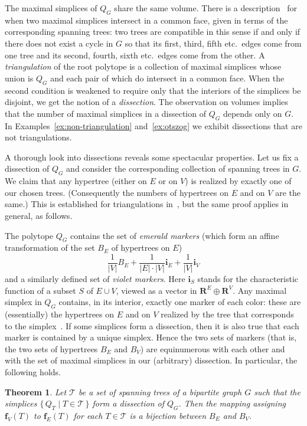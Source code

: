 \documentclass[10pt]{amsart}
\newtheorem{theo}{Theorem}[section]
\theoremstyle{definition}\newtheorem{defi}[theo]{Definition}
\theoremstyle{remark}\newtheorem{rema}[theo]{Remark}
\newcommand{\R}{\mathbf{R}}
\begin{document}
The maximal simplices of $Q_G$ share the same volume. There is a description~\cite[Lemma~12.6]{alex} for when two maximal simplices intersect in a common face, given in terms of the corresponding spanning trees: two trees are compatible in this sense if and only if there does not exist a cycle in $G$ so that its first, third, fifth etc.\ edges come from one tree and its second, fourth, sixth etc.\ edges come from the other. A \emph{triangulation} of the root polytope is a collection of maximal simplices whose union is $Q_G$ and each pair of which do intersect in a common face. When the second condition is weakened to require only that the interiors of the simplices be disjoint, we get the notion of a \emph{dissection}. The observation on volumes implies that the number of maximal simplices in a dissection of $Q_G$ depends only on $G$. In Examples~\ref{ex:non-triangulation} and~\ref{ex:otszog} we exhibit dissections that are not triangulations.

A thorough look into dissections reveals some spectacular properties. Let us fix a dissection of $Q_G$ and consider the corresponding collection of spanning trees in $G$. We claim that any hypertree (either on $E$ or on $V$) is realized by exactly one of our chosen trees. (Consequently the numbers of hypertrees on $E$ and on $V$ are the same.) This is established for triangulations in~\cite{alex}, but the same proof applies in general, as follows. 

The polytope $Q_G$ contains the set of \emph{emerald markers} (which form an affine transformation of the set $B_E$ of hypertrees on $E$)
\[\frac1{|V|}B_E+\frac1{|E|\cdot|V|}\mathbf i_E+\frac1{|V|}\mathbf i_V\]
and a similarly defined set of \emph{violet markers}. Here $\mathbf i_S$ stands for the characteristic function of a subset $S$ of $E\cup V$, viewed as a vector in $\R^E\oplus\R^V$. Any maximal simplex in $Q_G$ contains, in its interior, exactly one marker of each color: these are (essentially) the hypertrees on $E$ and on $V$ realized by the tree that corresponds to the simplex~\cite[Lemma~14.9]{alex}. If some simplices form a dissection, then it is also true that each marker is contained by a unique simplex. Hence the two sets of markers (that is, the two sets of hypertrees $B_E$ and $B_V$) are equinumerous with each other and with the set of maximal simplices in our (arbitrary) dissection. In particular, the following holds.

\begin{theo}
\label{l:quasitriang_gives_bijection}
Let $\mathcal{T}$ be a set of spanning trees of a bipartite graph $G$ such that the simplices $\{\,Q_T\mid T\in\mathcal{T}\,\}$ form a dissection of $Q_G$. Then the mapping assigning $\mathbf f_V(T)$ to $\mathbf f_E(T)$ for each $T\in\mathcal{T}$ is a bijection between $B_E$ and $B_V$.
\end{theo}
\end{document}

